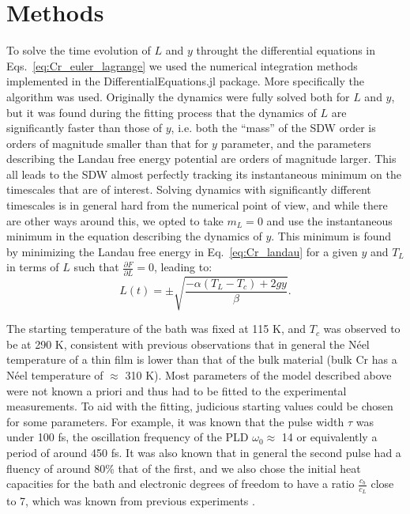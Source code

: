 \section{Methods}
To solve the time evolution of $L$ and $y$ throught the differential equations in Eqs.~\ref{eq:Cr_euler_lagrange} we used the numerical integration methods implemented in the DifferentialEquations.jl package. More specifically the  algorithm was used. Originally the dynamics were fully solved both for $L$ and $y$, but it was found during the fitting process that the dynamics of $L$ are significantly faster than those of $y$, i.e. both the ``mass'' of the SDW order is orders of magnitude smaller than that for $y$ parameter, and the parameters describing the Landau free energy potential are orders of magnitude larger. This all leads to the SDW almost perfectly tracking its instantaneous minimum on the timescales that are of interest.
Solving dynamics with significantly different timescales is in general hard from the numerical point of view, and while there are other ways around this, we opted to take $m_L = 0$ and use the instantaneous minimum in the equation describing the dynamics of $y$.
This minimum is found by minimizing the Landau free energy in Eq.~\ref{eq:Cr_landau} for a given $y$ and $T_L$ in terms of $L$ such that $\frac{\partial F}{\partial L} = 0$, leading to:
\begin{equation}
	L(t) = \pm \sqrt{\frac{- \alpha (T_L - T_c) + 2 g y}{\beta}}.
\end{equation}

The starting temperature of the bath was fixed at 115 K, and $T_c$ was observed to be at 290 K, consistent with previous observations that in general the N\'eel temperature of a thin film is lower than that of the bulk material (bulk Cr has a N\'eel temperature of $\approx$ 310 K).
Most parameters of the model described above were not known a priori and thus had to be fitted to the experimental measurements. To aid with the fitting, judicious starting values could be chosen for some parameters. For example, it was known that the pulse width $\tau$ was under 100 fs, the oscillation frequency of the PLD $\omega_0 \approx$ 14 or equivalently a period of around 450 fs. It was also known that in general the second pulse had a fluency of around 80\% that of the first, and we also chose the initial heat capacities for the bath and electronic degrees of freedom to have a ratio $\frac{c_b}{c_L}$ close to 7, which was known from previous experiments .

